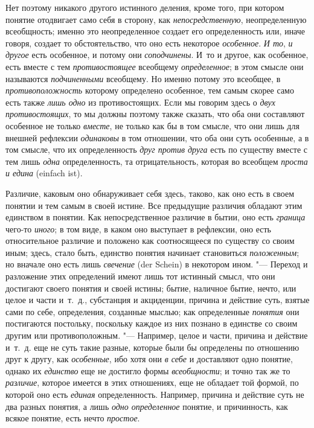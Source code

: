 {\label{bkm:bm22a}Нет поэтому никакого другого истинного
деления, кроме того, при котором понятие отодвигает само себя в сторону,
как {\em непосредственную},
неопределенную всеобщность; именно это
неопределенное создает его определенность или, иначе говоря,
создает то обстоятельство, что оно есть некоторое
{\em особенное}.
{\em И то},
{\em и другое} есть
особенное, и потому они
{\em соподчинены}. И~то и
другое, как особенное, есть вместе с тем
{\em противостоящее}
всеобщему
{\em определенное}; в
этом смысле они называются
{\em подчиненными}
всеобщему. Но именно потому это всеобщее, в
{\em противоположность}
которому определено особенное, тем самым скорее само есть
также {\em лишь одно} из
противостоящих. Если мы говорим здесь о
{\em двух противостоящих},
то мы должны поэтому также сказать, что оба они составляют
особенное не только {\em вместе},
не только как бы в том смысле, что они лишь для внешней
рефлексии {\em одинаковы}
в том отношении, что оба они суть особенные, а в том смысле,
что их определенность {\em друг против
друга} есть по существу вместе с тем лишь
{\em одна}
определенность, та отрицательность, которая во всеобщем
{\em проста и едина} (einfach ist).

Различие, каковым оно обнаруживает себя здесь, таково, как оно
есть в своем понятии и тем самым в своей истине. Все предыдущие различия
обладают этим единством в
понятии.
Как непосредственное различие в бытии, оно есть
{\em граница} чего-то
{\em иного}; в том
виде, в каком оно выступает в рефлексии, оно есть относительное различие и
положено как соотносящееся по существу со своим иным; здесь, стало быть,
единство понятия начинает становиться
{\em положенным}; но
вначале оно есть лишь {\em свечение}
(der Schein) в некотором ином. "--- Переход и
разложение этих определений имеют лишь тот истинный смысл, что они
достигают своего понятия и своей истины; бытие, наличное бытие, нечто, или
целое и части и~т.~д., субстанция и акциденции, причина и действие суть,
взятые сами по себе, определения, созданные мыслью; как определенные
{\em понятия} они
постигаются постольку, поскольку каждое из них познано в единстве со своим
другим или противоположным. "--- Например, целое и части,
причина и действие и~т.~д. еще не суть такие разные, которые были бы
определены по отношению друг к другу, как
{\em особенные}, ибо хотя
они {\em в себе} и
доставляют одно понятие, однако их
{\em единство} еще не
достигло формы {\em всеобщности};
и точно так же то
{\em различие}, которое
имеется в этих отношениях, еще не обладает той формой, по которой оно есть
{\em единая}
определенность. Например, причина и действие суть не два
разных понятия, а лишь {\em одно
определенное} понятие, и причинность, как всякое понятие,
есть нечто {\em простое}.

}

